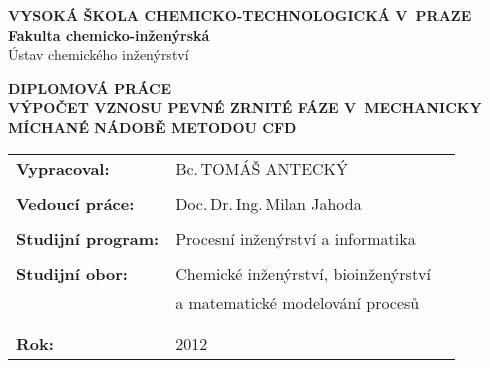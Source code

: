 \vspace{20mm}
\begin{center}
{\textbf{VYSOKÁ ŠKOLA CHEMICKO-TECHNOLOGICKÁ V~PRAZE}\\}
{\textbf{Fakulta chemicko-inženýrská}\\
Ústav chemického inženýrství\\}
\vspace{15mm}


\vspace{50mm}

{\huge \textbf{DIPLOMOVÁ PRÁCE\\}}
\vspace{25mm}
{\large \textbf{VÝPOČET VZNOSU PEVNÉ ZRNITÉ FÁZE V~MECHANICKY MÍCHANÉ NÁDOBĚ METODOU CFD\\}}
\end{center}
\vspace{35mm}

\begin{tabular}{p{60mm}lp{50mm}}
\textbf{Vypracoval:} & Bc.\,TOMÁŠ ANTECKÝ\\
\\
\textbf{Vedoucí práce:} & Doc.\,Dr.\,Ing.\,Milan Jahoda \\

\\
\textbf{Studijní program:} & Procesní inženýrství a informatika \\
\\
\textbf{Studijní obor:} & Chemické inženýrství, bioinženýrství  \\
	& a matematické modelování procesů\\
\\
\\
\textbf{Rok:} & 2012 \\
\end{tabular}

